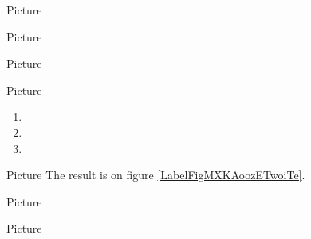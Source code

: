 
Picture 
\begin{center}
   
\end{center}
   
\begin{center}
   
\end{center}
   
\begin{center}
   
\end{center}
   

\clearpage

Picture 
\begin{center}
   
\end{center}
   

Picture 
\begin{center}
   
\end{center}
   


Picture 
\begin{center}
   
   
   
\end{center}

\begin{enumerate}
    \item
   
   \item
   
   \item
   
\end{enumerate}

Picture 
The result is on figure \ref{LabelFigMXKAoozETwoiTe}. %
\newcommand{\CaptionFigMXKAoozETwoiTe}{An histogram.}



Picture 
\begin{center}
   
\end{center}


Picture 
\begin{center}
   
\end{center}
   

